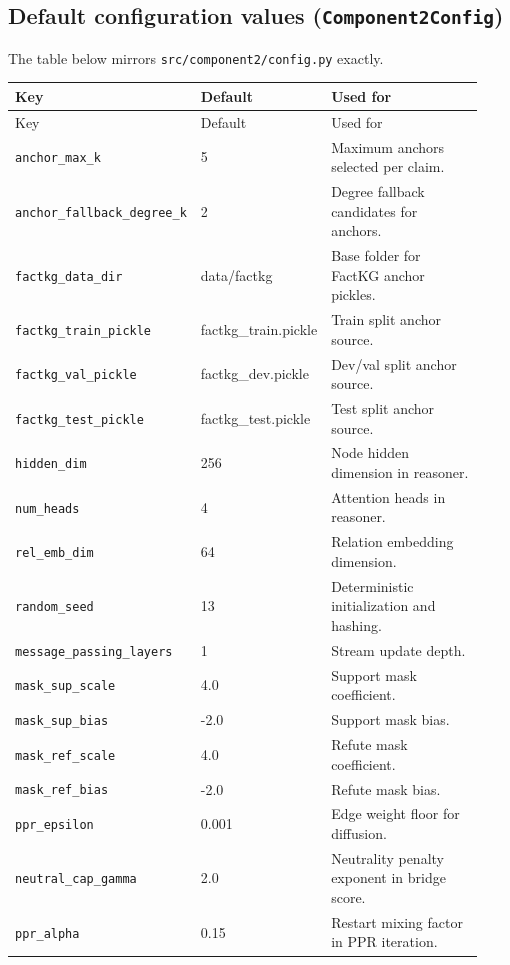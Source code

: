 \subsection{Default configuration values (\texttt{Component2Config})}
The table below mirrors \texttt{src/component2/config.py} exactly.

\begin{longtable}{@{}p{0.35\linewidth}p{0.18\linewidth}p{0.40\linewidth}@{}}
\toprule
Key & Default & Used for \\
\midrule
\endfirsthead
\toprule
Key & Default & Used for \\
\midrule
\endhead
\texttt{anchor\_max\_k} & 5 & Maximum anchors selected per claim. \\
\texttt{anchor\_fallback\_degree\_k} & 2 & Degree fallback candidates for anchors. \\
\texttt{factkg\_data\_dir} & data/factkg & Base folder for FactKG anchor pickles. \\
\texttt{factkg\_train\_pickle} & factkg\_train.pickle & Train split anchor source. \\
\texttt{factkg\_val\_pickle} & factkg\_dev.pickle & Dev/val split anchor source. \\
\texttt{factkg\_test\_pickle} & factkg\_test.pickle & Test split anchor source. \\
\texttt{hidden\_dim} & 256 & Node hidden dimension in reasoner. \\
\texttt{num\_heads} & 4 & Attention heads in reasoner. \\
\texttt{rel\_emb\_dim} & 64 & Relation embedding dimension. \\
\texttt{random\_seed} & 13 & Deterministic initialization and hashing. \\
\texttt{message\_passing\_layers} & 1 & Stream update depth. \\
\texttt{mask\_sup\_scale} & 4.0 & Support mask coefficient. \\
\texttt{mask\_sup\_bias} & -2.0 & Support mask bias. \\
\texttt{mask\_ref\_scale} & 4.0 & Refute mask coefficient. \\
\texttt{mask\_ref\_bias} & -2.0 & Refute mask bias. \\
\texttt{ppr\_epsilon} & 0.001 & Edge weight floor for diffusion. \\
\texttt{neutral\_cap\_gamma} & 2.0 & Neutrality penalty exponent in bridge score. \\
\texttt{ppr\_alpha} & 0.15 & Restart mixing factor in PPR iteration. \\

\end{longtable}
